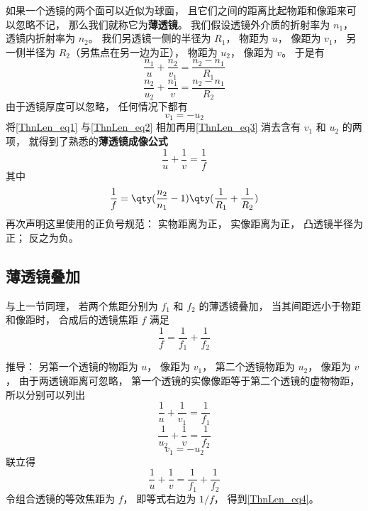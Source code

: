 如果一个透镜的两个面可以近似为球面， 且它们之间的距离比起物距和像距来可以忽略不记， 那么我们就称它为\textbf{薄透镜}。 我们假设透镜外介质的折射率为 $n_1$， 透镜内折射率为 $n_2$。 我们另透镜一侧的半径为 $R_1$， 物距为 $u$， 像距为 $v_1$， 另一侧半径为 $R_2$（另焦点在另一边为正）， 物距为 $u_2$， 像距为 $v$。 于是有
\begin{equation}\label{ThnLen_eq1}
\frac{n_1}{u} + \frac{n_2}{v_1} = \frac{n_2 - n_1}{R_1}
\end{equation}
\begin{equation}\label{ThnLen_eq2}
\frac{n_2}{u_2} + \frac{n_1}{v} = \frac{n_2 - n_1}{R_2}
\end{equation}
由于透镜厚度可以忽略， 任何情况下都有
\begin{equation}\label{ThnLen_eq3}
v_1 = -u_2
\end{equation}
将\autoref{ThnLen_eq1} 与\autoref{ThnLen_eq2} 相加再用\autoref{ThnLen_eq3} 消去含有 $v_1$ 和 $u_2$ 的两项， 就得到了熟悉的\textbf{薄透镜成像公式}
\begin{equation}
\frac{1}{u} + \frac{1}{v} = \frac{1}{f}
\end{equation}
其中
\begin{equation}
\frac{1}{f} = \qty(\frac{n_2}{n_1} - 1) \qty(\frac{1}{R_1} + \frac{1}{R_2})
\end{equation}
再次声明这里使用的正负号规范： 实物距离为正， 实像距离为正， 凸透镜半径为正； 反之为负。


\subsection{薄透镜叠加}
与上一节同理， 若两个焦距分别为 $f_1$ 和 $f_2$ 的薄透镜叠加， 当其间距远小于物距和像距时， 合成后的透镜焦距 $f$ 满足
\begin{equation}\label{ThnLen_eq4}
\frac{1}{f} = \frac{1}{f_1} + \frac{1}{f_2}
\end{equation}

推导： 另第一个透镜的物距为 $u$， 像距为 $v_1$， 第二个透镜物距为 $u_2$， 像距为 $v$， 由于两透镜距离可忽略， 第一个透镜的实像像距等于第二个透镜的虚物物距， 所以分别可以列出
\begin{equation}
\frac{1}{u} + \frac{1}{v_1} = \frac{1}{f_1}
\end{equation}
\begin{equation}
\frac{1}{u_2} + \frac{1}{v} = \frac{1}{f_2}
\end{equation}
\begin{equation}
v_1 = -u_2
\end{equation}
联立得
\begin{equation}
\frac{1}{u} + \frac{1}{v} = \frac{1}{f_1} + \frac{1}{f_2}
\end{equation}
令组合透镜的等效焦距为 $f$， 即等式右边为 $1/f$， 得到\autoref{ThnLen_eq4}。
